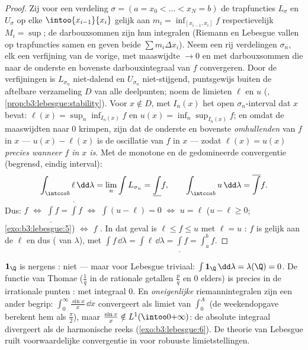 \begin{proof}
Zij voor een verdeling $\sigma = (a = x_0 < \dots < x_N = b)$ de
trapfuncties $L_\sigma$ en $U_\sigma$ op elke
$\intoo{x_{i-1}}{x_i}$ gelijk aan $m_i = \inf_{[x_{i-1}, x_i]}f$
respectievelijk $M_i = \sup$; de darbouxsommen zijn hun
integralen (Riemann en Lebesgue vallen op trapfuncties samen en
geven beide $\sum m_i\Delta x_i$). Neem een rij verdelingen
$\sigma_n$, elk een verfijning van de vorige, met maaswijdte $\to
0$ en met darbouxsommen die naar de onderste en bovenste
darbouxintegraal van $f$ convergeren. Door de verfijningen is
$L_{\sigma_n}$ niet-dalend en $U_{\sigma_n}$ niet-stijgend,
puntsgewijs buiten de aftelbare verzameling $D$ van alle
deelpunten; noem de limieten $\ell$ en $u$ (,
\cref{prop:b3:lebesgue:stability}). Voor $x \notin D$, met
$I_n(x)$ het open $\sigma_n$-interval dat $x$ bevat: $\ell(x) =
\sup_n\inf_{I_n(x)}f$ en $u(x) = \inf_n\sup_{I_n(x)}f$; en omdat
de maaswijdten naar $0$ krimpen, zijn dat de onderste en bovenste
\emph{omhullenden} van $f$ in $x$ --- $u(x) - \ell(x)$ is de
oscillatie van $f$ in $x$ --- zodat \emph{$\ell(x) = u(x)$ precies
wanneer $f$ in $x$  is}. Met de monotone en de
gedomineerde convergentie (begrensd, eindig interval):
\[
\int_{\intcc ab}\ell\,\dd\lambda = \lim_n\int L_{\sigma_n}
= \underline{\int}f,
\qquad
\int_{\intcc ab}u\,\dd\lambda = \overline{\int}f .
\]
Dus: $f$  $\iff$ $\underline\int f =
\overline\int f$ $\iff$ $\int(u - \ell) = 0$ $\iff$ $u = \ell$
 ($u - \ell \geq 0$; \cref{exo:b3:lebesgue:5}) $\iff$
$f$  . In dat geval is $\ell \leq f \leq u$ met
$\ell = u$ : $f$ is  gelijk aan de
 $\ell$ en dus  ( van
$\lambda$), met $\int f\,\dd\lambda = \int\ell\,\dd\lambda =
\underline\int f = \int_a^bf$.
\end{proof}

\begin{example}\label{ex:b3:lebesgue:riemannexamples}
$\mathbf 1_\Q$ is nergens : niet  ---
maar voor Lebesgue triviaal: $\int\mathbf 1_\Q\,\dd\lambda =
\lambda(\Q) = 0$. De functie van Thomae ($\frac1q$ in de rationale
getallen $\frac pq$ en $0$ elders) is precies in de irrationale
punten :  met integraal $0$. En
\emph{oneigenlijke} riemannintegralen zijn een ander begrip:
$\int_0^\infty\frac{\sin x}x\,\dd x$ convergeert als limiet van
$\int_0^A$ (de weekendopgave berekent hem als $\frac\pi2$), maar
$\frac{\sin x}x \notin L^1(\intoo0{+\infty})$: de absolute
integraal divergeert als de harmonische reeks
(\cref{exo:b3:lebesgue:6}). De theorie van Lebesgue ruilt
voorwaardelijke convergentie in voor robuuste limietstellingen.
\end{example}

